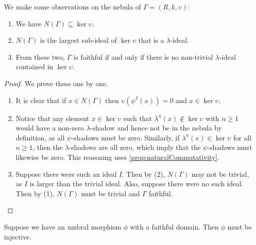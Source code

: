 \begin{proposition}
  We make some observations on the nebula of $\Gamma = (R, k, \upsilon)$:
  \begin{enumerate}
    \item We have $N(\Gamma) \subseteq \ker \upsilon$. 
    \item $N(\Gamma)$ is the largest sub-ideal of $\ker \upsilon$ that is a $\lambda$-ideal. 
    \item From these two, $\Gamma$ is faithful if and only if there is no non-trivial $\lambda$-ideal contained in $\ker \upsilon$.
  \end{enumerate}
\end{proposition}

\begin{proof}
  We prove these one by one.
  \begin{enumerate}
    \item It is clear that if $x \in N(\Gamma)$ then $\upsilon(\psi^1(x)) = 0$ and $x \in \ker \upsilon$.
    \item Notice that any element $x \in \ker \upsilon$ such that $\lambda^n(x) \notin \ker \upsilon$ with $n \ge 1$ would have a non-zero $\lambda$-shadow and hence not be in the nebula by definition, as all $\psi$-shadows must be zero. Similarly, if $\lambda^n(x) \in \ker \upsilon$ for all $n \ge 1$, then the $\lambda$-shadows are all zero, which imply that the $\psi$-shadows must likewise be zero. This reasoning  uses \ref{prop:naturalCommutativity}.
    \item Suppose there were such an ideal $I$. Then by (2), $N(\Gamma)$ may not be trivial, as $I$ is larger than the trivial ideal. Also, suppose there were no such ideal. Then by (1), $N(\Gamma)$ must be trivial and $\Gamma$ faithful. 
  \end{enumerate}
\end{proof}

\begin{proposition}
  Suppose we have an umbral morphism $\phi$ with a faithful domain. Then $\phi$ must be injective. 
\end{proposition}

